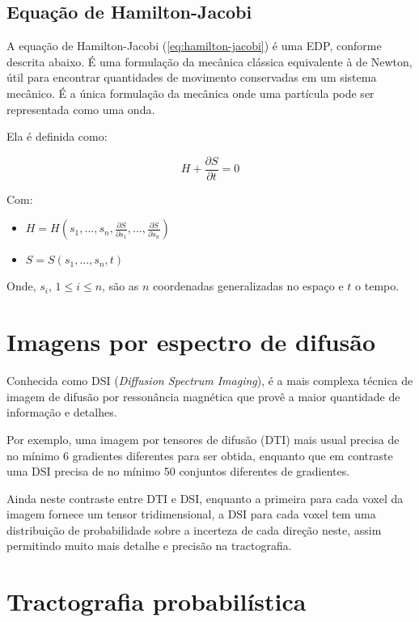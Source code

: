 \documentclass[a4paper,11pt]{report}
\begin{document}
    \subsection{Equação de Hamilton-Jacobi}
    A equação de Hamilton-Jacobi (\ref{eq:hamilton-jacobi}) é uma EDP, conforme descrita abaixo. É uma formulação da mecânica clássica equivalente à de Newton, útil para encontrar quantidades de movimento conservadas em um sistema mecânico. É a única formulação da mecânica onde uma partícula pode ser representada como uma onda.
    
    Ela é definida como: 

    \begin{equation} \label{eq:hamilton-jacobi}
      H + \frac{\partial S}{\partial t} = 0
    \end{equation}
    
    Com:
    
    \begin{itemize}
      \item $H = H(s_{1}, ..., s_{n}, \frac{\partial S}{\partial s_{1}}, ..., \frac{\partial S}{\partial s_{n}})$
      \item $S = S(s_{1}, ..., s_{n}, t)$
    \end{itemize}
    
    Onde, $s_{i}$, $1 \leq i \leq n$, são as $n$ coordenadas generalizadas no espaço e $t$ o tempo.
    
    
  \section{Imagens por espectro de difusão}
  Conhecida como DSI (\textit{Diffusion Spectrum Imaging}), é a mais complexa técnica de imagem de difusão por ressonância magnética que provê a maior quantidade de informação e detalhes.

  Por exemplo, uma imagem por tensores de difusão (DTI) mais usual precisa de no mínimo 6 gradientes diferentes para ser obtida, enquanto que em contraste uma DSI precisa de no mínimo 50 conjuntos diferentes de gradientes.

  Ainda neste contraste entre DTI e DSI, enquanto a primeira para cada voxel da imagem fornece um tensor tridimensional, a DSI para cada voxel tem uma distribuição de probabilidade sobre a incerteza de cada direção neste, assim permitindo muito mais detalhe e precisão na tractografia.

  \section{Tractografia probabilística}
  
\end{document}
